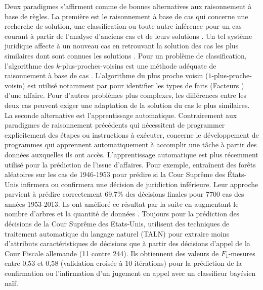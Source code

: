 Deux paradigmes s'affirment comme de bonnes alternatives aux raisonnement à base de règles. La première est le raisonnement à base de cas qui concerne une recherche de solution, une classification ou toute autre inférence pour un cas courant à partir de l'analyse d'anciens cas et de leurs solutions \citep{moens2002case-basedreasoning}. Un tel système juridique affecte à un nouveau cas en retrouvant la solution des cas les plus similaires dont sont connues les solutions \citep{Berka2011rbr-cbr}. Pour un problème de classification, l'algorithme des $k$-plus-proches-voisins est une méthode adéquate de raisonnement à base de cas \citep{poole2017chap7-supervisedML}. L'algorithme du plus proche voisin ($1$-plus-proche-voisin) est utilisé notamment par \citet{Ashley2009classifCases} pour identifier les types de faits (\og Facteurs \fg{}) d'une affaire. Pour d'autres problèmes plus complexes, les différences entre les deux cas peuvent exiger une adaptation de la solution du cas le plus similaires. La seconde alternative est l'apprentissage automatique. Contrairement aux paradigmes de raisonnement précédents qui nécessitent de programmer explicitement des étapes ou instructions à exécuter,  concerne le développement de programmes qui apprennent automatiquement à accomplir une tâche à partir des données auxquelles ils ont accès. L'apprentissage automatique est plus récemment utilisé pour la prédiction de l'issue d'affaires. Pour exemple, \citet{katz2014predicting} entraînent des forêts aléatoires \citep{breiman2001randomforest} sur les cas de 1946-1953 pour prédire si la Cour Suprême des États-Unis infirmera ou confirmera une décision de juridiction inférieure. Leur approche parvient à prédire correctement 69,7\% des décisions finales pour 7700 cas des années 1953-2013. Ils ont amélioré ce résultat par la suite en augmentant le nombre d'arbres et la quantité de données \citep{katz2017predictsupremecourt}. Toujours pour la prédiction des décisions de la Cour Suprême des Etats-Unis, \citet{waltl2017predictgermantaxlaw} utilisent des techniques de traitement automatique du langage naturel (TALN) pour extraire moins d'attributs caractéristiques de décisions que \citep{katz2014predicting} à partir des décisions d'appel de la Cour Fiscale allemande (11 contre 244). Ils obtiennent des valeurs de $F_1$-mesures entre 0,53 et 0,58 (validation croisée à 10 itérations) pour la prédiction  de la confirmation ou l'infirmation d'un jugement en appel avec un classifieur bayésien naïf.

